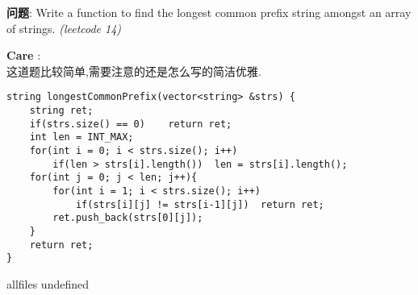 \documentclass{article}
\begin{document}
\begin{CJK}{UTF8}{gbsn}     %

\else
    
\begin{description}
    \item{\textbf{问题}}: Write a function to find the longest common prefix string amongst an array of strings. \textit{(leetcode 14)}
    \item{\textbf{Care}} : 
    \\这道题比较简单,需要注意的还是怎么写的简洁优雅.
    \begin{lstlisting}
string longestCommonPrefix(vector<string> &strs) {
	string ret;
	if(strs.size() == 0)	return ret;
	int len = INT_MAX;
	for(int i = 0; i < strs.size(); i++)
		if(len > strs[i].length())	len = strs[i].length();
	for(int j = 0; j < len; j++){
		for(int i = 1; i < strs.size(); i++)
			if(strs[i][j] != strs[i-1][j])	return ret;
		ret.push_back(strs[0][j]);
	}
	return ret;
}
    \end{lstlisting}
    \textit{}
\end{description}

\fi

\ifx allfiles undefined
\end{CJK}
\end{document}
